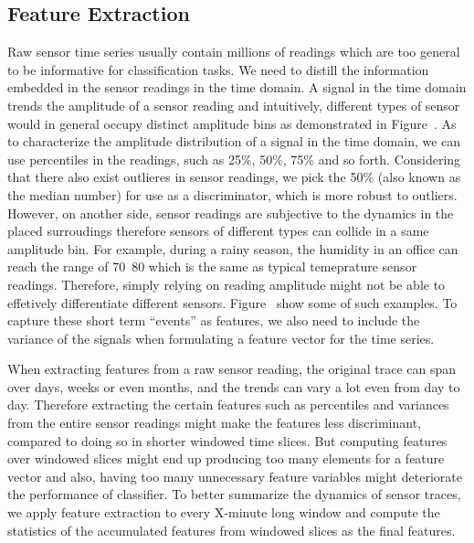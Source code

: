 \subsection{Feature Extraction}
Raw sensor time series usually contain millions of readings which are too general to be informative for classification
tasks. We need to distill the information embedded in the sensor readings in the time domain. A signal in the time domain
trends the amplitude of a sensor reading and intuitively, different types of sensor would in general occupy distinct
amplitude bins as demonstrated in Figure~\cite{}. As to characterize the amplitude distribution of a signal in the time
domain, we can use percentiles in the readings, such as 25\%, 50\%, 75\% and so forth. Considering that there also
exist outlieres in sensor readings, we pick the 50\% (also known as the median number) for use as a discriminator, which
is more robust to outliers. However, on another side, sensor readings are subjective to the dynamics in the placed
surroudings therefore sensors of different types can collide in a same amplitude bin. For example, during a rainy season, the humidity in an
office can reach the range of 70~80 which is the same as typical temeprature sensor readings. Therefore, simply relying
on reading amplitude might not be able to effetively differentiate different sensors. Figure~\cite{} show some of such
examples. To capture these short term ``events'' as features, we also need to include the variance of the signals when
formulating a feature vector for the time series.

When extracting features from a raw sensor reading, the original trace can span over days, weeks or even months, and
the trends can vary a lot even from day to day. Therefore extracting the certain features such as percentiles and
variances from the entire sensor readings might make the features less discriminant, compared to doing so in shorter
windowed time slices. But computing features over windowed slices might end up producing too many elements for a
feature vector and also, having too many unnecessary feature variables might deteriorate the performance of classifier.
To better summarize the dynamics of sensor traces, we apply feature extraction to every X-minute long window and compute
the statistics of the accumulated features from windowed slices as the final features. 

